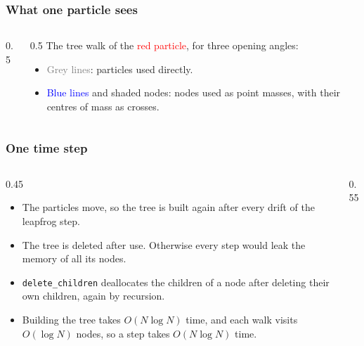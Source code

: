 \begin{frame}
  \frametitle{What one particle sees}
  \begin{columns}[T]
    \begin{column}{0.5\textwidth}
      \centering
      
    \end{column}

    \begin{column}{0.5\textwidth}
      The tree walk of the \textcolor{red}{red particle}, for three opening angles:
      \begin{itemize}
        \item \textcolor{gray}{Grey lines}: particles used directly.
        \item \textcolor{blue}{Blue lines} and shaded nodes: nodes used as point masses, with their centres of mass as crosses.
      \end{itemize}

      \vspace*{2mm}
    \end{column}
  \end{columns}
\end{frame}


\begin{frame}
  \frametitle{One time step}
  \begin{columns}[T]
    \begin{column}{0.45\textwidth}
      \begin{itemize}
        \item The particles move, so the tree is built again after every drift of the leapfrog step.
        \item The tree is deleted after use. Otherwise every step would leak the memory of all its nodes.
        \item \texttt{delete\_children} deallocates the children of a node after deleting their own children, again by recursion.
        \item Building the tree takes $O(N \log N)$ time, and each walk visits $O(\log N)$ nodes, so a step takes $O(N \log N)$ time.
      \end{itemize}
    \end{column}

    \begin{column}{0.55\textwidth}
      \centering
      
    \end{column}
  \end{columns}
\end{frame}


